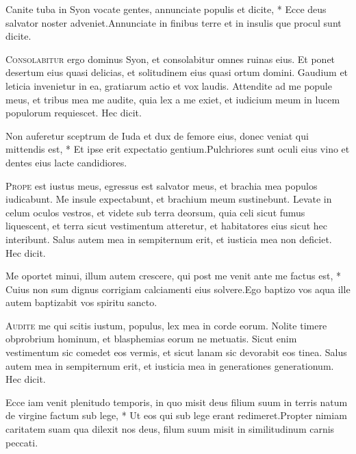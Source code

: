 \begin{multicols*}{2}
\begin{responsory}
{Canite tuba in Syon vocate gentes, annunciate populis et dicite, * Ecce deus salvator noster adveniet.}{Annunciate in finibus terre et in insulis que procul sunt dicite.}
\end{responsory}
\lettrine[lines=2]{\zallmancaps \color{Blue} C}{onsolabitur} ergo dominus Syon, et consolabitur omnes ruinas eius. Et ponet desertum eius quasi delicias, et solitudinem eius quasi ortum domini. Gaudium et leticia invenietur in ea, gratiarum actio et vox laudis. Attendite ad me popule meus, et tribus mea me audite, quia lex a me exiet, et iudicium meum in lucem populorum requiescet. Hec dicit.
\begin{responsory}
{Non auferetur sceptrum de Iuda et dux de femore eius, donec veniat qui mittendis est, * Et ipse erit expectatio gentium.}{Pulchriores sunt oculi eius vino et dentes eius lacte candidiores.}
\end{responsory}
\lettrine[lines=2]{\zallmancaps \color{Red} P}{rope} est iustus meus, egressus est salvator meus, et brachia mea populos iudicabunt. Me insule expectabunt, et brachium meum sustinebunt. Levate in celum oculos vestros, et videte sub terra deorsum, quia celi sicut fumus liquescent, et terra sicut vestimentum atteretur, et habitatores eius sicut hec interibunt. Salus autem mea in sempiternum erit, et iusticia mea non deficiet. Hec dicit.
\begin{responsory-doxology}[me-oportet]
{Me oportet minui, illum autem crescere, qui post me venit ante me factus est, * Cuius non sum dignus corrigiam calciamenti eius solvere.}{Ego baptizo vos aqua ille autem baptizabit vos spiritu sancto.}
\end{responsory-doxology}
\lettrine[lines=2]{\zallmancaps \color{Blue} A}{udite} me qui scitis iustum, populus, lex mea in corde eorum. Nolite timere obprobrium hominum, et blasphemias eorum ne metuatis. Sicut enim vestimentum sic comedet eos vermis, et sicut lanam sic devorabit eos tinea. Salus autem mea in sempiternum erit, et iusticia mea in generationes generationum. Hec dicit.
\begin{responsory}
{Ecce iam venit plenitudo temporis, in quo misit deus filium suum in terris natum de virgine factum sub lege, * Ut eos qui sub lege erant redimeret.}{Propter nimiam caritatem suam qua dilexit nos deus, filum suum misit in similitudinum carnis peccati.}

\end{responsory}
\end{multicols*}
